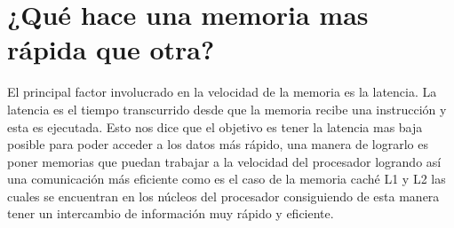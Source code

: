 \documentclass{article}
\begin{document}
\section{¿Qué hace una memoria mas rápida que otra?}

El principal factor involucrado en la velocidad de la memoria es la latencia. La latencia es el tiempo transcurrido desde que la memoria recibe una instrucción y esta es ejecutada. Esto nos dice que el objetivo es tener la latencia mas baja posible para poder acceder a los datos más rápido, una manera de lograrlo es poner memorias que puedan trabajar a la velocidad del procesador logrando así una comunicación más eficiente como es el caso de la memoria caché L1 y L2 las cuales se encuentran en los núcleos del procesador consiguiendo de esta manera tener un intercambio de información muy rápido y eficiente.

\cite{youbioit}


\end{document}
